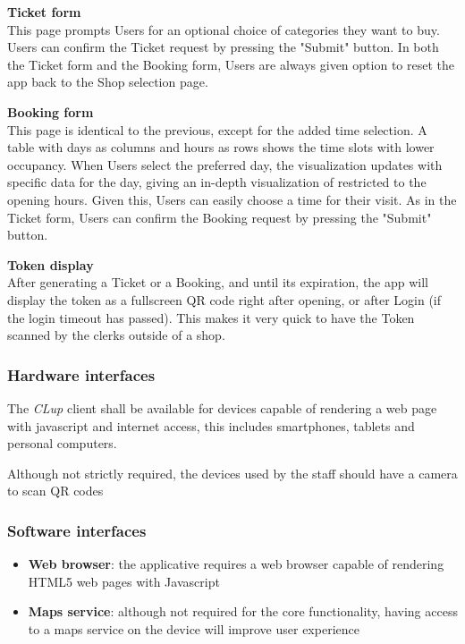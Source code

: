 \textbf{Ticket form}\\
This page prompts Users for an optional choice of categories they want to buy. Users can confirm the Ticket request by pressing the "Submit" button. In both the Ticket form and the Booking form, Users are always given option to reset the app back to the Shop selection page.

\textbf{Booking form}\\
This page is identical to the previous, except for the added time selection. A table with days as columns and hours as rows shows the time slots with lower occupancy. When Users select the preferred day, the visualization updates with specific data for the day, giving an in-depth visualization of restricted to the opening hours. Given this, Users can easily choose a time for their visit. As in the Ticket form, Users can confirm the Booking request by pressing the "Submit" button.

\textbf{Token display}\\
After generating a Ticket or a Booking, and until its expiration, the app will display the token as a fullscreen QR code right after opening, or after Login (if the login timeout has passed).
This makes it very quick to have the Token scanned by the clerks outside of a shop.

\subsubsection{Hardware interfaces}
The \emph{CLup} client shall be available for devices capable of rendering a web page with javascript and internet access, this includes smartphones, tablets and personal computers.

Although not strictly required, the devices used by the staff should have a camera to scan QR codes

\subsubsection{Software interfaces}
\begin{itemize}
    \item \textbf{Web browser}: the applicative requires a web browser capable of rendering HTML5 web pages with Javascript
    \item \textbf{Maps service}: although not required for the core functionality, having access to a maps service on the device will improve user experience
\end{itemize}

